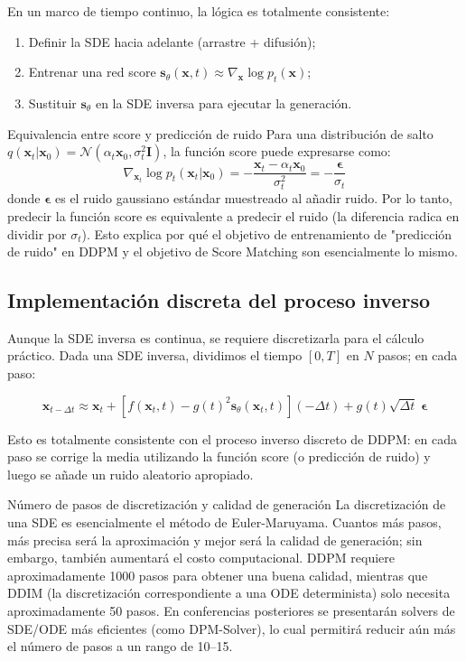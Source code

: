 En un marco de tiempo continuo, la lógica es totalmente consistente:
\begin{enumerate}
    \item Definir la SDE hacia adelante (arrastre + difusión);
    \item Entrenar una red score $\mathbf{s}_\theta(\mathbf{x}, t) \approx \nabla_{\mathbf{x}} \log p_t(\mathbf{x})$;
    \item Sustituir $\mathbf{s}_\theta$ en la SDE inversa para ejecutar la generación.
\end{enumerate}

\begin{knowledgebox}{Equivalencia entre score y predicción de ruido}
Para una distribución de salto $q(\mathbf{x}_t | \mathbf{x}_0) = \mathcal{N}(\alpha_t \mathbf{x}_0, \sigma_t^2 \mathbf{I})$, la función score puede expresarse como:
$$
\nabla_{\mathbf{x}_t} \log p_t(\mathbf{x}_t | \mathbf{x}_0) = -\frac{\mathbf{x}_t - \alpha_t \mathbf{x}_0}{\sigma_t^2} = -\frac{\boldsymbol{\epsilon}}{\sigma_t}
$$
donde $\boldsymbol{\epsilon}$ es el ruido gaussiano estándar muestreado al añadir ruido. Por lo tanto, predecir la función score es equivalente a predecir el ruido (la diferencia radica en dividir por $\sigma_t$). Esto explica por qué el objetivo de entrenamiento de "predicción de ruido" en DDPM y el objetivo de Score Matching son esencialmente lo mismo.
\end{knowledgebox}

\subsection{Implementación discreta del proceso inverso}

Aunque la SDE inversa es continua, se requiere discretizarla para el cálculo práctico. Dada una SDE inversa, dividimos el tiempo $[0, T]$ en $N$ pasos; en cada paso:

$$
\mathbf{x}_{t-\Delta t} \approx \mathbf{x}_t + \left[f(\mathbf{x}_t, t) - g(t)^2 \mathbf{s}_\theta(\mathbf{x}_t, t)\right](-\Delta t) + g(t)\sqrt{\Delta t}\;\boldsymbol{\epsilon}
$$

Esto es totalmente consistente con el proceso inverso discreto de DDPM: en cada paso se corrige la media utilizando la función score (o predicción de ruido) y luego se añade un ruido aleatorio apropiado.

\begin{warningbox}{Número de pasos de discretización y calidad de generación}
La discretización de una SDE es esencialmente el método de Euler-Maruyama. Cuantos más pasos, más precisa será la aproximación y mejor será la calidad de generación; sin embargo, también aumentará el costo computacional. DDPM requiere aproximadamente 1000 pasos para obtener una buena calidad, mientras que DDIM (la discretización correspondiente a una ODE determinista) solo necesita aproximadamente 50 pasos. En conferencias posteriores se presentarán solvers de SDE/ODE más eficientes (como DPM-Solver), lo cual permitirá reducir aún más el número de pasos a un rango de 10--15.
\end{warningbox}

